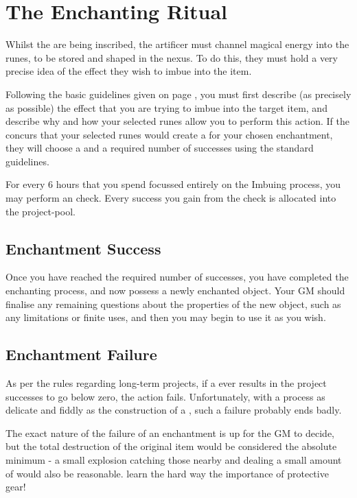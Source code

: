 \newpage

\section{The Enchanting Ritual}

Whilst the  are being inscribed, the artificer must channel magical energy into the runes, to be stored and shaped in the nexus. To do this, they must hold a very precise idea of the effect they wish to imbue into the item. 

Following the basic  guidelines given on page \pageref{S:ArtificingBasics}, you must first describe (as precisely as possible) the effect that you are trying to imbue into the target item, and describe why and how your selected runes allow you to perform this action. If the  concurs that your selected runes would create a  for your chosen enchantment, they will choose a  and a required number of successes using the standard  guidelines. 

For every 6 hours that you spend focussed entirely on the Imbuing process, you may perform an  check. Every success you gain from the check is allocated into the project-pool. 

\subsection{Enchantment Success}

Once you have reached the required number of successes, you have completed the enchanting process, and now possess a newly enchanted object. Your GM should finalise any remaining questions about the properties of the new object, such as any limitations or finite uses, and then you may begin to use it as you wish.


\subsection{Enchantment Failure}

As per the rules regarding long-term projects, if a  ever results in the project successes to go below zero, the action fails. Unfortunately, with a process as delicate and fiddly as the construction of a , such a failure probably ends badly. 

The exact nature of the failure of an enchantment is up for the GM to decide, but the total destruction of the original item would be considered the absolute minimum - a small explosion catching those nearby and dealing a small amount of  would also be reasonable.  learn the hard way the importance of protective gear!







